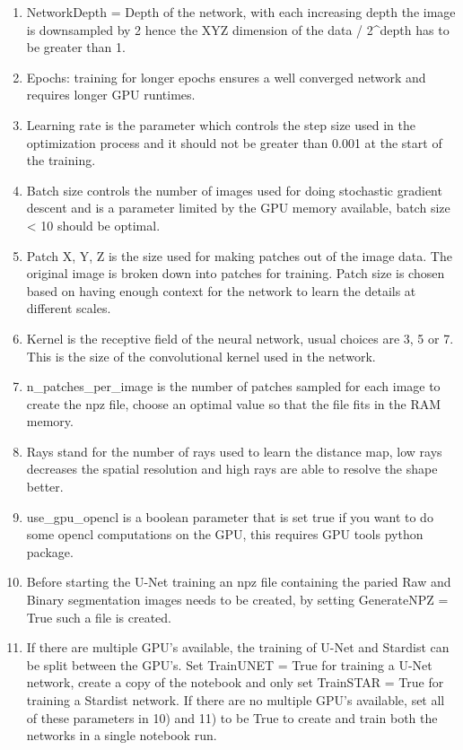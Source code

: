 \documentclass[letterpaper,compsoc,twoside]{IEEEtran}
\begin{document}
\begin{enumerate}
\renewcommand{\labelenumi}{\arabic{enumi})}
\item 

NetworkDepth = Depth of the network, with each increasing depth the image is downsampled by 2 hence the XYZ dimension of the data / 2\textasciicircum{}depth has to be greater than 1.
\item 

Epochs: training for longer epochs ensures a well converged network and requires longer GPU runtimes.
\item 

Learning rate is the parameter which controls the step size used in the optimization process and it should not be greater than 0.001 at the start of the training.
\item 

Batch size controls the number of images used for doing stochastic gradient descent and is a parameter limited by the GPU memory available, batch size < 10 should be optimal.
\item 

Patch X, Y, Z is the size used for making patches out of the image data. The original image is broken down into patches for training. Patch size is chosen based on having enough context for the network to learn the details at different scales.
\item 

Kernel is the receptive field of the neural network, usual choices are 3, 5 or 7. This is the size of the convolutional kernel used in the network.
\item 

n\_patches\_per\_image is the number of patches sampled for each image to create the npz file, choose an optimal value so that the file fits in the RAM memory.
\item 

Rays stand for the number of rays used to learn the distance map, low rays decreases the spatial resolution and high rays are able to resolve the shape better.
\item 

use\_gpu\_opencl is a boolean parameter that is set true if you want to do some opencl computations on the GPU, this requires GPU tools python package.
\item 

Before starting the U-Net training an npz file containing the paried Raw and Binary segmentation images needs to be created, by setting GenerateNPZ = True such a file is created.
\item 

If there are multiple GPU's available, the training of U-Net and Stardist can be split between the GPU's. Set TrainUNET = True  for training a U-Net network, create a copy of the notebook and only set TrainSTAR = True for training a Stardist network. If there are no multiple GPU's available, set all of these parameters in 10) and 11) to be True to create and train both the networks in a single notebook run.\end{enumerate}
\end{document}
